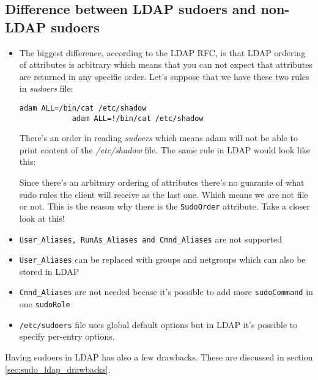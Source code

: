 \documentclass[12pt,a4paper,titlepage,final]{article}
\begin{document}
\subsection{Difference between LDAP sudoers and non-LDAP sudoers}
\begin{itemize} 
	\item The biggest difference, according to the LDAP RFC, is that LDAP ordering
		of attributes is arbitrary which means that you can not expect that
		attributes are returned in any specific order. 
		Let's suppose that we have these two rules in \emph{sudoers} file:

		\begin{lstlisting}[basicstyle=\ttfamily\small,frame=lines,showtabs=false]
			adam ALL=/bin/cat /etc/shadow
			adam ALL=!/bin/cat /etc/shadow
		\end{lstlisting}

		There's an order in reading \emph{sudoers} which means adam will not be able
		to print content of the \emph{/etc/shadow} file. The same rule in LDAP would
		look like this:

		
		Since there's an arbitrary ordering of attributes there's no guarante of what
		sudo rules the client will receive as the last one. Which means we are not 
		file or not. This is the reason why there is the \texttt{SudoOrder}
		attribute. {\color{blue}Take a closer look at this!}

	\item \texttt{User\_Aliases, RunAs\_Aliases and Cmnd\_Aliases} are not supported
	\item \texttt{User\_Aliases} can be replaced with groups and netgroups which can
		also be stored in LDAP
	\item \texttt{Cmnd\_Aliases} are not needed becase it's possible to add more
		\texttt{sudoCommand} in one \texttt{sudoRole}
	\item \texttt{/etc/sudoers} file uses global default options but in LDAP it's
		possible to specify per-entry options.
\end{itemize}

Having sudoers in LDAP has also a few drawbacks. These are discussed in section
\ref{sec:sudo_ldap_drawbacks}.
\end{document}
